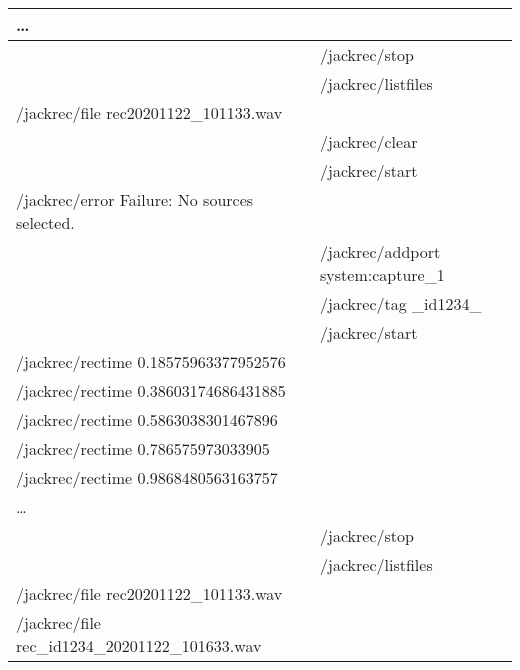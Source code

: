 \begin{tabular}{|l|l|}
  \dots                                           &                                    \\
  \hline
                                                  & /jackrec/stop                      \\
  \hline
                                                  & /jackrec/listfiles                 \\
  \hline
  /jackrec/file rec20201122\_101133.wav           &                                    \\
  \hline
  \hline
                                                  & /jackrec/clear                     \\
                                                  & /jackrec/start                     \\
  \hline
   /jackrec/error Failure: No sources selected.   &                                    \\
  \hline
  \hline
                                                  & /jackrec/addport system:capture\_1 \\
                                                  & /jackrec/tag \_id1234\_            \\
                                                  & /jackrec/start                     \\
  \hline
  /jackrec/rectime 0.18575963377952576            &                                    \\
  /jackrec/rectime 0.38603174686431885            &                                    \\
  /jackrec/rectime 0.5863038301467896             &                                    \\
  /jackrec/rectime 0.786575973033905              &                                    \\
  /jackrec/rectime 0.9868480563163757             &                                    \\
  \dots                                           &                                    \\
  \hline
                                                  & /jackrec/stop                      \\
  \hline
                                                  & /jackrec/listfiles                 \\
  \hline
  /jackrec/file rec20201122\_101133.wav           &                                    \\
  /jackrec/file rec\_id1234\_20201122\_101633.wav &                                    \\
  \hline
\end{tabular}

